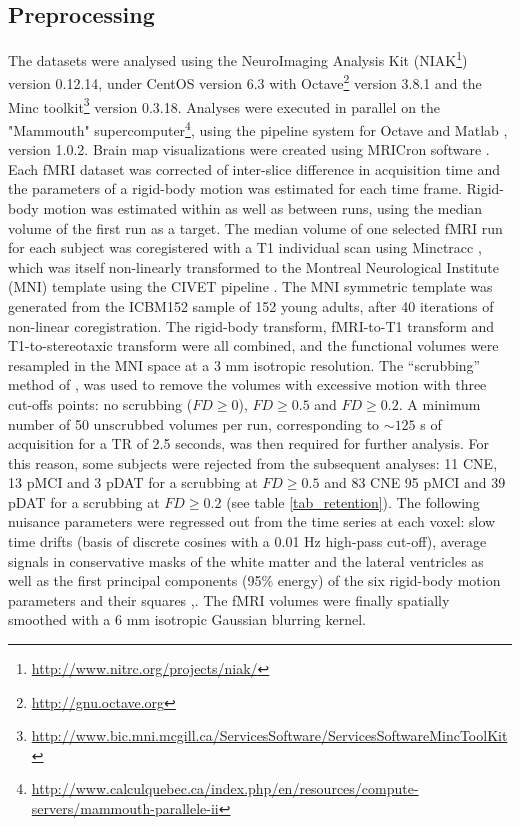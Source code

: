 \documentclass[authoryear]{elsarticle}
\begin{document}
\subsection{Preprocessing}
The datasets were analysed using the NeuroImaging Analysis Kit (NIAK\footnote{\url{http://www.nitrc.org/projects/niak/}}) version 0.12.14, under CentOS version 6.3 with Octave\footnote{\url{http://gnu.octave.org}} version 3.8.1 and the Minc toolkit\footnote{\url{http://www.bic.mni.mcgill.ca/ServicesSoftware/ServicesSoftwareMincToolKit}} version 0.3.18. Analyses were executed in parallel on the "Mammouth" supercomputer\footnote{\url{http://www.calculquebec.ca/index.php/en/resources/compute-servers/mammouth-parallele-ii}}, using the pipeline system for Octave and Matlab \citep{Bellec2010}, version 1.0.2. Brain map visualizations were created using MRICron software \cite{Rorden2007}. Each fMRI dataset was corrected of inter-slice difference in acquisition time and the parameters of a rigid-body motion was estimated for each time frame. Rigid-body motion was estimated within as well as between runs, using the median volume of the first run as a target. The median volume of one selected fMRI run for each subject was 
coregistered with a T1 individual scan using Minctracc \citep{Collins1998}, which was itself non-linearly transformed to the Montreal Neurological Institute (MNI) template \citep{Fonov2011} using the CIVET pipeline \citep{Zijdenbos2002}. The MNI symmetric template was generated from the ICBM152 sample of 152 young adults, after 40 iterations of non-linear coregistration. The rigid-body transform, fMRI-to-T1 transform and T1-to-stereotaxic transform were all combined, and the functional volumes were resampled in the MNI space at a 3 mm isotropic resolution. The “scrubbing” method of \citep{Power2012}, was used to remove the volumes with excessive motion with three cut-offs points: no scrubbing ($FD\geq0$), $FD\geq0.5$ and $FD\geq0.2$. A minimum number of 50 unscrubbed volumes per run, corresponding to $\sim 125$ s of acquisition for a TR of 2.5 seconds, was then required for further analysis. For this reason, some subjects were rejected from the subsequent analyses: 11 CNE, 13 pMCI 
and 3 pDAT for a scrubbing at $FD\geq0.5$ and 83 CNE 95 pMCI and 39 pDAT for a scrubbing at $FD\geq0.2$ (see table \ref{tab_retention}). The following nuisance parameters were regressed out from the time series at each voxel: slow time drifts (basis of discrete cosines with a 0.01 Hz high-pass cut-off), average signals in conservative masks of the white matter and the lateral ventricles as well as the first principal components (95\% energy) of the six rigid-body motion parameters and their squares \citep{Lund2006},\citep{Giove2009}. The fMRI volumes were finally spatially smoothed with a 6 mm isotropic Gaussian blurring kernel. 
\end{document}
